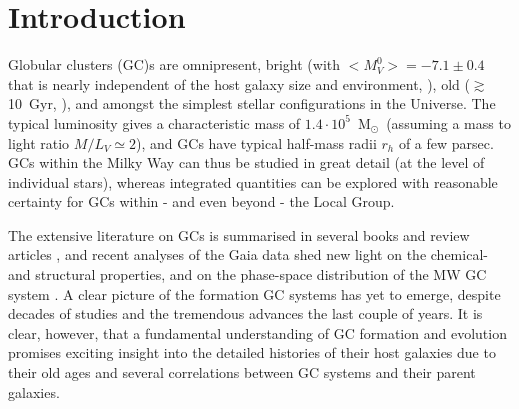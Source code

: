 \documentclass[a4paper,fleqn,usenatbib]{mnras}
\newcommand{\Sun}[0]{\ensuremath{_{\odot}}}
\begin{document}
\section{Introduction}
Globular clusters (GC)s are omnipresent, bright (with ${<}M^0_V{>} = -7.1 \pm 0.4$
that is nearly independent of the host galaxy size and environment,
\citealt{1991ARA&A..29..543H}), old ($\gtrsim$10~Gyr, \citealt{2005A&A...439..997P,
2005AJ....130.1315S, 2009ApJ...694.1498M, 2013ApJ...775..134V}), and amongst the
simplest stellar configurations in the Universe. The typical luminosity gives
a characteristic mass of $1.4\cdot 10^5$~M\Sun \, (assuming a mass to light ratio
$M/L_V \simeq 2$), and GCs have typical half-mass radii $r_h$ of a few parsec.
GCs within the Milky Way can thus be studied in great detail (at the level of 
individual stars), whereas integrated quantities can be explored with reasonable 
certainty for GCs within - and even beyond \citep[e.g.][]{1991ARA&A..29..543H} -
the Local Group. 

The extensive literature on GCs is summarised in several 
books and review articles \citep[e.g.][]{1991ARA&A..29..543H, Harris2001, 2004Natur.427...31W, 
2006ARA&A..44..193B, 2012A&ARv..20...50G, 2014CQGra..31x4006K, 2018RSPSA.47470616F},
and recent analyses of the Gaia data shed new light on the chemical- and structural 
properties, and on the phase-space distribution of the MW GC system \citep[e.g.][]{
2018A&A...616A..12G, 2018ApJ...859L..13B, 2019A&A...621A..56P, 2019MNRAS.484.2832V}.
A clear picture of the formation GC systems has yet to emerge, despite decades 
of studies and the tremendous advances the last couple of years. It is clear, 
however, that a fundamental understanding of GC formation and evolution promises 
exciting insight into the detailed histories of their host galaxies due to their
old ages and several correlations between GC systems and their parent galaxies.

\end{document}
